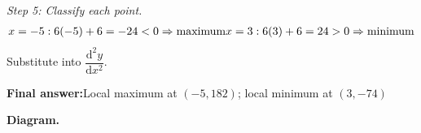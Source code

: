 \documentclass[11pt]{article}
\begin{document}
\textit{Step 5: Classify each point.}
\[\begin{gathered}
x=-5: 6(-5)+6 = -24 < 0 \Rightarrow \text{maximum} \newline x=3: 6(3)+6 = 24 > 0 \Rightarrow \text{minimum}
\end{gathered}\]
Substitute into \( \dfrac{\mathrm{d}^2y}{\mathrm{d}x^2} \).

\begin{answerbox}
\textbf{Final answer:}\quad Local maximum at \(\displaystyle  (-5, 182) \); local minimum at \(\displaystyle  (3, -74) \)
\end{answerbox}
\textbf{Diagram.}

\begin{center}
\end{center}
\end{document}
